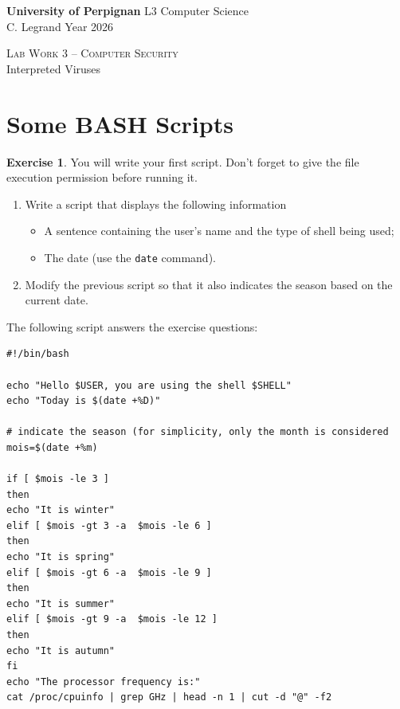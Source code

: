 \documentclass[a4paper,11pt]{article}
\newcommand{\itemb}{\item[$\bullet$]}
\theoremstyle{plain}
\theoremstyle{definition}
\newtheorem{exercice}{Exercise}
\begin{document}
\hbox{}
\noindent \textbf{University of Perpignan} \hfill  L3 Computer Science \\
 \hfill C. Legrand \hfill  Year 2026  \\
\smallskip
\begin{center}
{
 {\scshape \large Lab Work 3 -- Computer Security}  \\
 Interpreted Viruses
}
\end{center}
\hbox{}

\bigskip

\bigskip

\section{Some BASH Scripts}
  
\begin{exercice}

 You will write your first script. Don't forget to give the file execution permission before running it.  
\begin{enumerate}
\item Write a script that displays the following information
\begin{itemize}
\itemb A sentence containing the user's name and the type of shell being used;
\itemb The date (use the \verb|date| command).
\end{itemize}
\item Modify the previous script so that it also indicates the season based on the current date.
\end{enumerate}
\end{exercice}


\begin{correction}
The following script answers the exercise questions:
\begin{verbatim}
#!/bin/bash

echo "Hello $USER, you are using the shell $SHELL"
echo "Today is $(date +%D)"

# indicate the season (for simplicity, only the month is considered
mois=$(date +%m)

if [ $mois -le 3 ]
then 
echo "It is winter"
elif [ $mois -gt 3 -a  $mois -le 6 ]
then
echo "It is spring"
elif [ $mois -gt 6 -a  $mois -le 9 ]
then
echo "It is summer"
elif [ $mois -gt 9 -a  $mois -le 12 ]
then
echo "It is autumn"
fi
echo "The processor frequency is:"
cat /proc/cpuinfo | grep GHz | head -n 1 | cut -d "@" -f2

\end{verbatim}
\end{correction}
\end{document}
